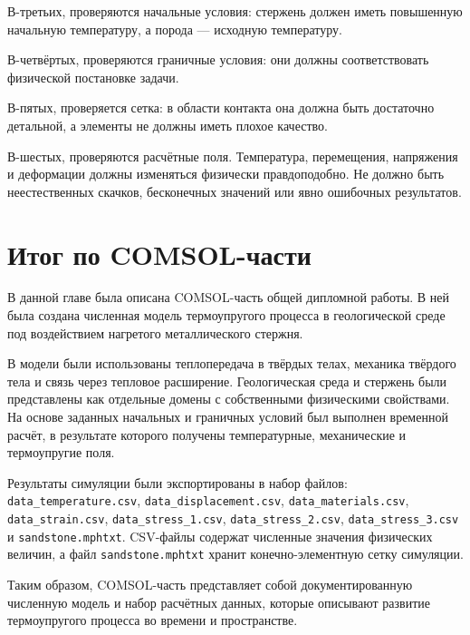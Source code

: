 В-третьих, проверяются начальные условия: стержень должен иметь повышенную начальную температуру, а порода --- исходную температуру.

В-четвёртых, проверяются граничные условия: они должны соответствовать физической постановке задачи.

В-пятых, проверяется сетка: в области контакта она должна быть достаточно детальной, а элементы не должны иметь плохое качество.

В-шестых, проверяются расчётные поля. Температура, перемещения, напряжения и деформации должны изменяться физически правдоподобно. Не должно быть неестественных скачков, бесконечных значений или явно ошибочных результатов.

\section{Итог по COMSOL-части}

В данной главе была описана COMSOL-часть общей дипломной работы. В ней была создана численная модель термоупругого процесса в геологической среде под воздействием нагретого металлического стержня.

В модели были использованы теплопередача в твёрдых телах, механика твёрдого тела и связь через тепловое расширение. Геологическая среда и стержень были представлены как отдельные домены с собственными физическими свойствами. На основе заданных начальных и граничных условий был выполнен временной расчёт, в результате которого получены температурные, механические и термоупругие поля.

Результаты симуляции были экспортированы в набор файлов: \texttt{data\_temperature.csv}, \texttt{data\_displacement.csv}, \texttt{data\_materials.csv}, \texttt{data\_strain.csv}, \texttt{data\_stress\_1.csv}, \texttt{data\_stress\_2.csv}, \texttt{data\_stress\_3.csv} и \texttt{sandstone.mphtxt}. CSV-файлы содержат численные значения физических величин, а файл \texttt{sandstone.mphtxt} хранит конечно-элементную сетку симуляции.

Таким образом, COMSOL-часть представляет собой документированную численную модель и набор расчётных данных, которые описывают развитие термоупругого процесса во времени и пространстве.
